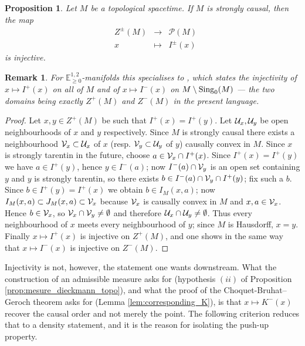 \documentclass[a4paper,twoside]{article}
\newcommand{\fonctionn}[4]{
	\displaystyle\begin{array}{l|rcl}
	& \displaystyle #1 & \longrightarrow & \displaystyle #2 \\
    & \displaystyle #3 & \longmapsto & \displaystyle #4 \end{array}
}
\newcommand{\mass}[1]{\mathbb{E}^{1,2}_{#1}}
\newtheorem{prop}[lem]{Proposition}
\newtheorem{rem}[lem]{Remark}
\begin{document}
\begin{prop} \label{prop:FZenon_injectif}Let $M$ be a topological spacetime. If $M$ is strongly causal, then
the map $$\fonctionn{Z^\pm(M)}{\mathcal{P}(M)}{x}{I^\pm(x)}$$
is injective.
\end{prop}
\begin{rem}
For $\mass{\geq0}$-manifolds this specialises to \cite[Prop.~1.10]{brunswic2021cauchy}, which states the injectivity of $x\mapsto I^+(x)$ on all of $M$ and of $x\mapsto I^-(x)$ on $M\setminus \mathrm{Sing}_0(M)$ --- the two domains being exactly $Z^+(M)$ and $Z^-(M)$ in the present language.
\end{rem}
\begin{proof}
Let $x,y\in Z^+(M)$ be such that $I^+(x)=I^+(y)$. Let $\mathcal{U}_x,\mathcal{U}_y$ be open neighbourhoods
of $x$ and $y$ respectively. Since $M$ is strongly causal
there exists a neighbourhood $\mathcal V_x\subset \mathcal{U}_x$ of $x$ (resp. $\mathcal V_y\subset \mathcal{U}_y$ of $y$) causally convex in $M$.
Since $x$ is strongly tarentin in the future, choose $a\in \mathcal V_x\cap I^+(x)$.
Since $I^+(x)=I^+(y)$ we have $a\in I^+(y)$, hence $y\in I^-(a)$; now $I^-(a)\cap \mathcal V_y$ is an open set containing $y$
and $y$ is strongly tarentin, so there exists $b\in I^-(a)\cap \mathcal V_y \cap I^+(y)$; fix such a $b$.
Since $b\in I^+(y)=I^+(x)$ we obtain $b\in I_M(x,a)$; now $I_M(x,a)\subset J_M(x,a) \subset \mathcal V_x$ because $\mathcal V_x$
is causally convex in $M$ and $x,a\in \mathcal V_x$. Hence $b\in \mathcal V_x$, so $\mathcal V_x\cap \mathcal V_y\neq \emptyset$
and therefore $\mathcal{U}_x\cap \mathcal{U}_y\neq \emptyset$.
Thus every neighbourhood of $x$ meets every neighbourhood of $y$; since $M$ is Hausdorff, $x=y$.
Finally $x\mapsto I^+(x)$ is injective on $Z^+(M)$, and one shows in the same way that
$x\mapsto I ^-(x)$ is injective on $Z^-(M)$.
\end{proof}

Injectivity is not, however, the statement one wants downstream. What the construction of an
admissible measure asks for (hypothesis $(ii)$ of Proposition \ref{prop:mesure_dieckmann_topo}), and
what the proof of the Choquet-Bruhat--Geroch theorem asks for (Lemma \ref{lem:corresponding_K}), is
that $x\mapsto K^-(x)$ recover the causal order and not merely the point. The following criterion
reduces that to a density statement, and it is the reason for isolating the push-up property.
\end{document}
